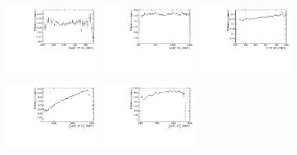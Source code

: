 \begin{figure}[h]
\centering
\includegraphics[height=!,width=0.32\textwidth]{figs/AcceptancePhsp/eff_Kpipi.pdf}
\includegraphics[height=!,width=0.32\textwidth]{figs/AcceptancePhsp/eff_Kpi.pdf}
\includegraphics[height=!,width=0.32\textwidth]{figs/AcceptancePhsp/eff_pipi.pdf}

\includegraphics[height=!,width=0.32\textwidth]{figs/AcceptancePhsp/eff_Dspipi.pdf}
\includegraphics[height=!,width=0.32\textwidth]{figs/AcceptancePhsp/eff_Dspi.pdf}


\end{figure}
